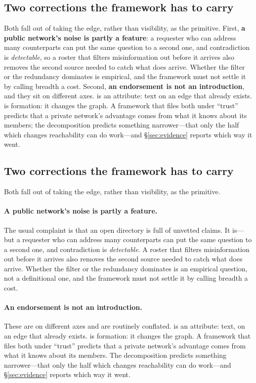 \ifcompact
\subsection{Two corrections the framework has to carry}

Both fall out of taking the edge, rather than visibility, as the primitive. First,
\textbf{a public network's noise is partly a feature}: a requester who can address many
counterparts can put the same question to a second one, and contradiction is
\emph{detectable}, so a roster that filters misinformation out before it arrives also
removes the second source needed to catch what does arrive. Whether the filter or the
redundancy dominates is empirical, and the framework must not settle it by calling breadth
a cost. Second, \textbf{an endorsement is not an introduction}, and they sit on different
axes.  is an attribute: text on an edge that already
exists.  is formation: it
changes the graph. A framework that files both under ``trust'' predicts that a private
network's advantage comes from what it knows about its members; the decomposition predicts
something narrower---that only the half which changes reachability can do work---and
\S\ref{sec:evidence} reports which way it went.
\else
\subsection{Two corrections the framework has to carry}

Both fall out of taking the edge, rather than visibility, as the primitive.

\paragraph{A public network's noise is partly a feature.} The usual complaint is that an
open directory is full of unvetted claims. It is---but a requester who can address many
counterparts can put the same question to a second one, and contradiction is
\emph{detectable}. A roster that filters misinformation out before it arrives also
removes the second source needed to catch what does arrive. Whether the filter or the
redundancy dominates is an empirical question, not a definitional one, and the framework
must not settle it by calling breadth a cost.

\paragraph{An endorsement is not an introduction.} These are on different axes and are
routinely conflated.  is an attribute: text, on an
edge that already exists.  is
formation: it changes the graph. A framework that files both under ``trust'' predicts
that a private network's advantage comes from what it knows about its members. The
decomposition predicts something narrower---that only the half which changes reachability
can do work---and \S\ref{sec:evidence} reports which way it went.
\fi
